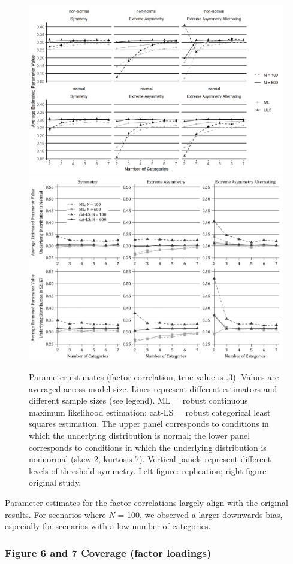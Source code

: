 \documentclass[10,a4paperpaper,]{article}
\begin{document}
\begin{figure}
\includegraphics[width=0.49\linewidth]{./figures/fig_5} \includegraphics[width=0.49\linewidth]{./figures/fig5_original} \caption{Parameter estimates (factor correlation, true value is .3). Values are averaged across model size. Lines represent different estimators and different sample sizes (see legend). ML = robust continuous maximum likelihood estimation; cat-LS = robust categorical least squares estimation. The upper panel corresponds to conditions in which the underlying distribution is normal; the lower panel corresponds to conditions in which the underlying distribution is nonnormal (skew 2, kurtosis 7). Vertical panels represent different levels of threshold symmetry. Left figure: replication; right figure original study.}\label{fig:fig5}
\end{figure}

Parameter estimates for the factor correlations largely align with the
original results. For scenarios where \emph{N} = 100, we observed a
larger downwards bias, especially for scenarios with a low number of
categories.

\subsubsection{Figure 6 and 7 Coverage (factor loadings)}
\end{document}
